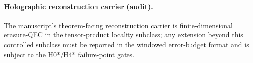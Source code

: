 \paragraph{Holographic reconstruction carrier (audit).} \AuditTag The manuscript's theorem-facing reconstruction carrier is finite-dimensional erasure-QEC in the tensor-product locality subclass; any extension beyond this controlled subclass must be reported in the windowed error-budget format and is subject to the H0*/H4* failure-point gates.